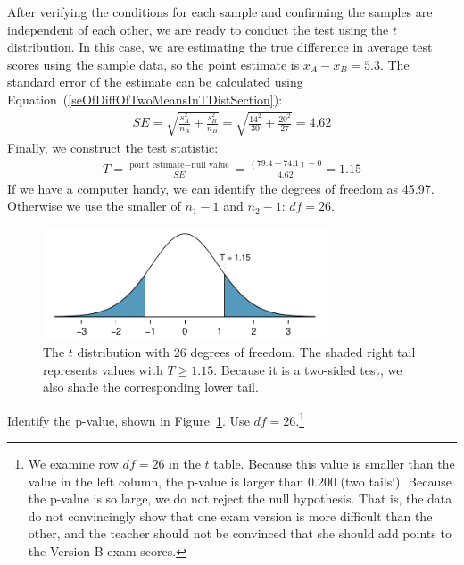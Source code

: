 After verifying the conditions for each sample and confirming the samples are independent of each other, we are ready to conduct the test using the $t$ distribution. In this case, we are estimating the true difference in average test scores using the sample data, so the point estimate is $\bar{x}_A - \bar{x}_B = 5.3$. The standard error of the estimate can be calculated using Equation~(\ref{seOfDiffOfTwoMeansInTDistSection}):
\begin{eqnarray*}
SE = \sqrt{\frac{s_A^2}{n_A} + \frac{s_B^2}{n_B}} = \sqrt{\frac{14^2}{30} + \frac{20^2}{27}} = 4.62
\end{eqnarray*}
Finally, we construct the test statistic:
\begin{eqnarray*}
T = \frac{\text{point estimate} - \text{null value}}{SE} = \frac{(79.4-74.1) - 0}{4.62} = 1.15
\end{eqnarray*}
If we have a computer handy, we can identify the degrees of freedom as 45.97. Otherwise we use the smaller of $n_1-1$ and $n_2-1$: $df=26$. 

\begin{figure}
\centering
\includegraphics[width=0.75\textwidth]{05/figures/pValueOfTwoTailAreaOfExamVersionsWhereDFIs26/pValueOfTwoTailAreaOfExamVersionsWhereDFIs26}
\caption{The $t$ distribution with 26 degrees of freedom. The shaded right tail represents values with $T \geq 1.15$. Because it is a two-sided test, we also shade the corresponding lower tail.}
\label{pValueOfTwoTailAreaOfExamVersionsWhereDFIs26}
\end{figure}

\begin{exercise} \label{computeTwoTailAreaOfExamVersionsWhereDFIs26}
Identify the p-value, shown in Figure~\ref{pValueOfTwoTailAreaOfExamVersionsWhereDFIs26}. Use $df=26$.\footnote{We examine row $df=26$ in the $t$ table. Because this value is smaller than the value in the left column, the p-value is larger than 0.200 (two tails!). Because the p-value is so large, we do not reject the null hypothesis. That is, the data do not convincingly show that one exam version is more difficult than the other, and the teacher should not be convinced that she should add points to the Version B exam scores.}


\end{exercise}


